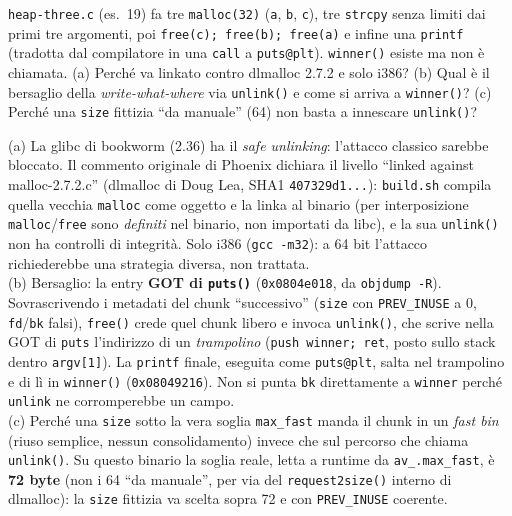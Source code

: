\question[8]
\lstinline|heap-three.c| (es.\ 19) fa tre \lstinline|malloc(32)| (\lstinline|a|, \lstinline|b|, \lstinline|c|), tre \lstinline|strcpy| senza limiti dai primi tre argomenti, poi \lstinline|free(c); free(b); free(a)| e infine una \lstinline|printf| (tradotta dal compilatore in una \lstinline|call| a \lstinline|puts@plt|). \lstinline|winner()| esiste ma non è chiamata.
(a) Perché va linkato contro dlmalloc 2.7.2 e solo i386? (b) Qual è il bersaglio della \emph{write-what-where} via \lstinline|unlink()| e come si arriva a \lstinline|winner()|? (c) Perché una \lstinline|size| fittizia ``da manuale'' (64) non basta a innescare \lstinline|unlink()|?
\begin{solution}
(a) La glibc di bookworm (2.36) ha il \emph{safe unlinking}: l'attacco classico sarebbe bloccato. Il commento originale di Phoenix dichiara il livello ``linked against malloc-2.7.2.c'' (dlmalloc di Doug Lea, SHA1 \lstinline|407329d1...|): \lstinline|build.sh| compila quella vecchia \lstinline|malloc| come oggetto e la linka al binario (per interposizione \lstinline|malloc|/\lstinline|free| sono \emph{definiti} nel binario, non importati da libc), e la sua \lstinline|unlink()| non ha controlli di integrità. Solo i386 (\lstinline|gcc -m32|): a 64 bit l'attacco richiederebbe una strategia diversa, non trattata.\\
(b) Bersaglio: la entry \textbf{GOT di \texttt{puts()}} (\lstinline|0x0804e018|, da \lstinline|objdump -R|). Sovrascrivendo i metadati del chunk ``successivo'' (\lstinline|size| con \lstinline|PREV_INUSE| a 0, \lstinline|fd|/\lstinline|bk| falsi), \lstinline|free()| crede quel chunk libero e invoca \lstinline|unlink()|, che scrive nella GOT di \lstinline|puts| l'indirizzo di un \emph{trampolino} (\lstinline|push winner; ret|, posto sullo stack dentro \lstinline|argv[1]|). La \lstinline|printf| finale, eseguita come \lstinline|puts@plt|, salta nel trampolino e di lì in \lstinline|winner()| (\lstinline|0x08049216|). Non si punta \lstinline|bk| direttamente a \lstinline|winner| perché \lstinline|unlink| ne corromperebbe un campo.\\
(c) Perché una \lstinline|size| sotto la vera soglia \lstinline|max_fast| manda il chunk in un \emph{fast bin} (riuso semplice, nessun consolidamento) invece che sul percorso che chiama \lstinline|unlink()|. Su questo binario la soglia reale, letta a runtime da \lstinline|av_.max_fast|, è \textbf{72 byte} (non i 64 ``da manuale'', per via del \lstinline|request2size()| interno di dlmalloc): la \lstinline|size| fittizia va scelta sopra 72 e con \lstinline|PREV_INUSE| coerente.
\end{solution}
